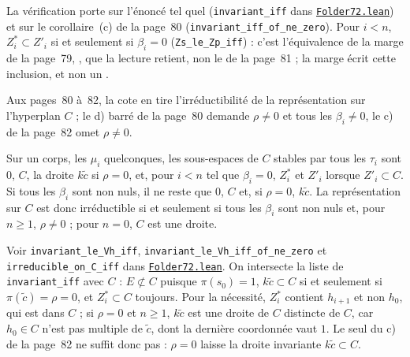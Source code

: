 \noindent La vérification porte sur l'énoncé tel quel (\texttt{invariant\_iff} dans \href{\leanblob/Geometry/Folder72.lean}{\texttt{Folder72.\allowbreak{}lean}}) et sur le corollaire~(c) de la page~80 (\texttt{invariant\_iff\_of\_ne\_zero}). Pour $i < n$, $Z^*_i \subset Z'_i$ si et seulement si $\beta_i = 0$ (\texttt{Zs\_le\_Zp\_iff}) : c'est l'équivalence de la marge de la page~79, , que la lecture retient, non le \q{$\notin$} de la page~81 ; la marge écrit cette inclusion, et non un \q{$\in$}.

Aux pages~80 à~82, la cote en tire l'irréductibilité de la représentation sur l'hyperplan $C$ ; le d) barré de la page~80 demande $\rho \neq 0$ et tous les $\beta_i \neq 0$, le c) de la page~82 omet $\rho \neq 0$.

\begin{encadre}
\begin{theoreme}
Sur un corps, les $\mu_i$ quelconques, les sous-espaces de $C$ stables par tous les $\tau_i$ sont $0$, $C$, la droite $k\tilde c$ si $\rho = 0$, et, pour $i < n$ tel que $\beta_i = 0$, $Z^*_i$ et $Z'_i$ lorsque $Z'_i \subset C$. Si tous les $\beta_i$ sont non nuls, il ne reste que $0$, $C$ et, si $\rho = 0$, $k\tilde c$. La représentation sur $C$ est donc irréductible si et seulement si tous les $\beta_i$ sont non nuls et, pour $n \geq 1$, $\rho \neq 0$ ; pour $n = 0$, $C$ est une droite.
\end{theoreme}
\end{encadre}

\begingroup\raggedright
\noindent Voir \texttt{invariant\_le\_Vh\_iff}, \texttt{invariant\_le\_Vh\_iff\_of\_ne\_zero} et \texttt{irreducible\_on\_C\_iff} dans \href{\leanblob/Geometry/Folder72.lean}{\texttt{Folder72.\allowbreak{}lean}}. On intersecte la liste de \texttt{invariant\_iff} avec $C$ : $E \not\subset C$ puisque $\pi(s_0) = 1$, $k\tilde c \subset C$ si et seulement si $\pi(\tilde c) = \rho = 0$, et $Z^*_i \subset C$ toujours. Pour la nécessité, $Z^*_i$ contient $h_{i+1}$ et non $h_0$, qui est dans $C$ ; si $\rho = 0$ et $n \geq 1$, $k\tilde c$ est une droite de $C$ distincte de $C$, car $h_0 \in C$ n'est pas multiple de $\tilde c$, dont la dernière coordonnée vaut $1$. Le seul  du c) de la page~82 ne suffit donc pas : $\rho = 0$ laisse la droite invariante $k\tilde c \subset C$.\par\endgroup

